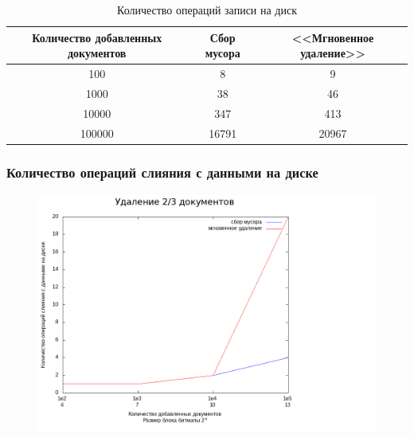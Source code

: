 \begin{table}[H]
      \caption{Количество операций записи на диск}
      \centering
      \small
      \singlespacing
      \begin{tabular}{|c|c|c|}
            \hline
            Количество добавленных документов   & Сбор мусора                 & <<Мгновенное удаление>>     \\ \hline \hline
            100                                 & 8                           & 9                           \\ \hline
            1000                                & 38                          & 46                          \\ \hline
            10000                               & 347                         & 413                         \\ \hline
            100000                              & 16791                       & 20967                       \\ \hline
\end{tabular}
\end{table}

\subsubsection{Количество операций слияния с данными на диске}

\begin{figure}[H]
\centering
\includegraphics[width=\linewidth]{fig/merges.png}
\end{figure}

